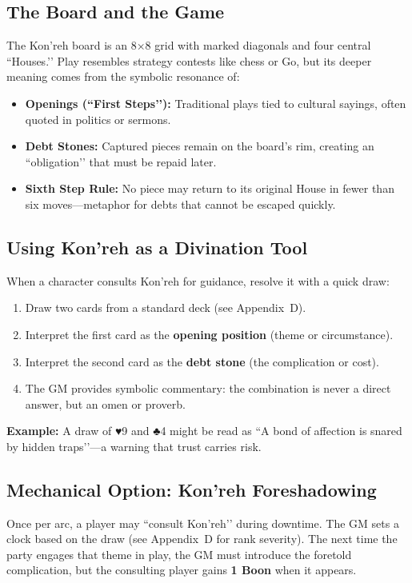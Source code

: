 \documentclass[12pt]{book}
\begin{document}
\subsection{The Board and the Game}
The Kon’reh board is an 8×8 grid with marked diagonals and four central ``Houses.’’ Play resembles strategy contests like chess or Go, but its deeper meaning comes from the symbolic resonance of:
\begin{itemize}
  \item \textbf{Openings (``First Steps’’):} Traditional plays tied to cultural sayings, often quoted in politics or sermons.
  \item \textbf{Debt Stones:} Captured pieces remain on the board’s rim, creating an ``obligation’’ that must be repaid later.
  \item \textbf{Sixth Step Rule:} No piece may return to its original House in fewer than six moves—metaphor for debts that cannot be escaped quickly.
\end{itemize}

\subsection{Using Kon’reh as a Divination Tool}
When a character consults Kon’reh for guidance, resolve it with a quick draw:
\begin{enumerate}
  \item Draw two cards from a standard deck (see Appendix~D).
  \item Interpret the first card as the \textbf{opening position} (theme or circumstance).
  \item Interpret the second card as the \textbf{debt stone} (the complication or cost).
  \item The GM provides symbolic commentary: the combination is never a direct answer, but an omen or proverb.
\end{enumerate}
\textbf{Example:} A draw of ♥9 and ♣4 might be read as ``A bond of affection is snared by hidden traps’’—a warning that trust carries risk.

\subsection{Mechanical Option: Kon’reh Foreshadowing}
Once per arc, a player may ``consult Kon’reh’’ during downtime. The GM sets a clock based on the draw (see Appendix~D for rank severity). The next time the party engages that theme in play, the GM must introduce the foretold complication, but the consulting player gains \textbf{1 Boon} when it appears.
\end{document}

